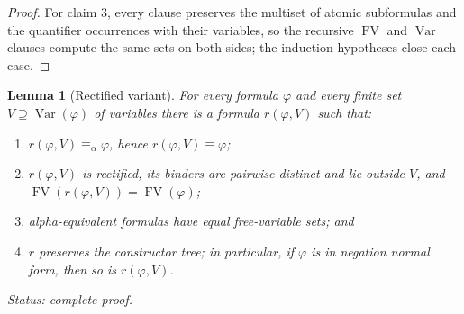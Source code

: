 \documentclass[11pt,oneside,openany]{book}
\theoremstyle{definition}
\theoremstyle{plain}
\newtheorem{lemma}[definition]{Lemma}
\theoremstyle{remark}
\newcommand{\FV}{\operatorname{FV}}
\begin{document}
\begin{proof}
For claim 3, every clause preserves the multiset of atomic subformulas
and the quantifier occurrences with their variables, so the recursive
\(\FV\) and \(\operatorname{Var}\) clauses compute the same sets on both
sides; the induction hypotheses close each case.
\end{proof}

\begin{lemma}[Rectified variant]
\label{lem:rectified-variant}
For every formula \(\varphi\) and every finite set
\(V\supseteq\operatorname{Var}(\varphi)\) of variables there is a formula
\(r(\varphi,V)\) such that:
\begin{enumerate}
  \item \(r(\varphi,V)\equiv_\alpha\varphi\), hence
        \(r(\varphi,V)\equiv\varphi\);
  \item \(r(\varphi,V)\) is rectified, its binders are pairwise distinct
        and lie outside \(V\), and
        \(\FV(r(\varphi,V))=\FV(\varphi)\);
  \item alpha-equivalent formulas have equal free-variable sets; and
  \item \(r\) preserves the constructor tree; in particular, if
        \(\varphi\) is in negation normal form, then so is
        \(r(\varphi,V)\).
\end{enumerate}
\textit{Status: complete proof.}
\end{lemma}
\end{document}
